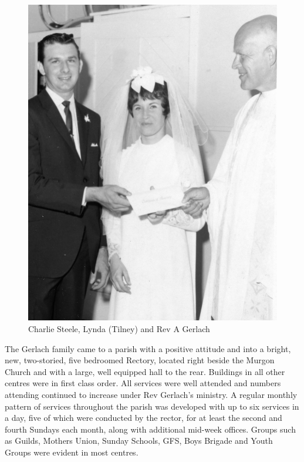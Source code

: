 \begin{figure}
\begin{center}
\includegraphics[width=1.\linewidth,center]{../images/lyndaTilneyVestry.jpg}
\caption{Charlie Steele, Lynda (Tilney) and Rev A Gerlach}
\end{center}
\end{figure}




The Gerlach family came to a parish with a positive attitude and into a bright, new, two-storied, five bedroomed Rectory, located right beside the Murgon Church and with a large, well equipped hall to the rear. Buildings in all other centres were in first class order. All services were well attended and numbers attending continued to increase under Rev Gerlach's ministry. A regular monthly pattern of services throughout the parish was developed with up to six services in a day, five of which were conducted by the rector, for at least the second and fourth Sundays each month, along with additional mid-week offices. Groups such as Guilds, Mothers Union, Sunday Schools, GFS, Boys Brigade and Youth Groups were evident in most centres.



